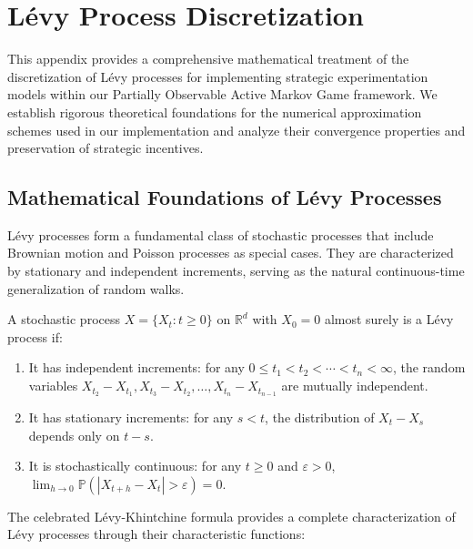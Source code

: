 \section{Lévy Process Discretization}
\label{appendix:levy_discretization}

This appendix provides a comprehensive mathematical treatment of the discretization of Lévy processes for implementing strategic experimentation models within our Partially Observable Active Markov Game framework. We establish rigorous theoretical foundations for the numerical approximation schemes used in our implementation and analyze their convergence properties and preservation of strategic incentives.

\subsection{Mathematical Foundations of Lévy Processes}
\label{appendix:levy_foundations}

Lévy processes form a fundamental class of stochastic processes that include Brownian motion and Poisson processes as special cases. They are characterized by stationary and independent increments, serving as the natural continuous-time generalization of random walks.

\begin{definition}
A stochastic process $X = \{X_t : t \geq 0\}$ on $\mathbb{R}^d$ with $X_0 = 0$ almost surely is a Lévy process if:
\begin{enumerate}
    \item It has independent increments: for any $0 \leq t_1 < t_2 < \cdots < t_n < \infty$, the random variables $X_{t_2} - X_{t_1}, X_{t_3} - X_{t_2}, \ldots, X_{t_n} - X_{t_{n-1}}$ are mutually independent.
    \item It has stationary increments: for any $s < t$, the distribution of $X_t - X_s$ depends only on $t-s$.
    \item It is stochastically continuous: for any $t \geq 0$ and $\varepsilon > 0$, $\lim_{h \to 0} \mathbb{P}(|X_{t+h} - X_t| > \varepsilon) = 0$.
\end{enumerate}
\end{definition}

The celebrated Lévy-Khintchine formula provides a complete characterization of Lévy processes through their characteristic functions:

